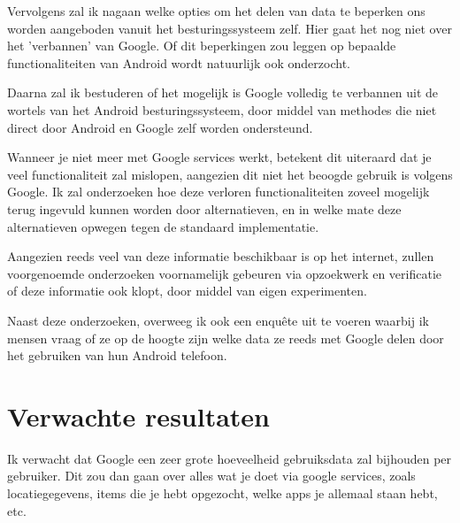 \vspace{2mm}

Vervolgens zal ik nagaan welke opties om het delen van data te beperken ons worden aangeboden vanuit het besturingssysteem zelf. Hier gaat het nog niet over het 'verbannen' van Google. Of dit beperkingen zou leggen op bepaalde functionaliteiten van Android wordt natuurlijk ook onderzocht.

\vspace{5mm}

Daarna zal ik bestuderen of het mogelijk is Google volledig te verbannen uit de wortels van het Android besturingssysteem, door middel van methodes die niet direct door Android en Google zelf worden ondersteund.

\vspace{2mm}

Wanneer je niet meer met Google services werkt, betekent dit uiteraard dat je veel functionaliteit zal mislopen, aangezien dit niet het beoogde gebruik is volgens Google. Ik zal onderzoeken hoe deze verloren functionaliteiten zoveel mogelijk terug ingevuld kunnen worden door alternatieven, en in welke mate deze alternatieven opwegen tegen de standaard implementatie.

\vspace{2mm}

Aangezien reeds veel van deze informatie beschikbaar is op het internet, zullen voorgenoemde onderzoeken voornamelijk gebeuren via opzoekwerk en verificatie of deze informatie ook klopt, door middel van eigen experimenten.

\vspace{2mm}

Naast deze onderzoeken, overweeg ik ook een enquête uit te voeren waarbij ik mensen vraag of ze op de hoogte zijn welke data ze reeds met Google delen door het gebruiken van hun Android telefoon.

\section{Verwachte resultaten}
\label{sec:verwachte_resultaten}

Ik verwacht dat Google een zeer grote hoeveelheid gebruiksdata zal bijhouden per gebruiker. Dit zou dan gaan over alles wat je doet via google services, zoals locatiegegevens, items die je hebt opgezocht, welke apps je allemaal staan hebt, etc.

